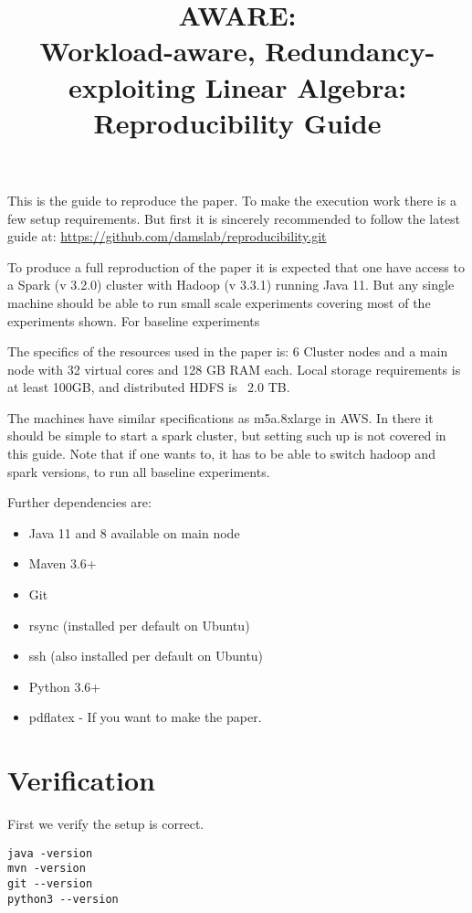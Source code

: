 \documentclass{readme}
\title{AWARE: \\ Workload-aware, Redundancy-exploiting Linear Algebra: \\ Reproducibility Guide}
\begin{document}
\maketitle

This is the guide to reproduce the paper.
To make the execution work there is a few setup requirements.
But first it is sincerely recommended to follow the latest guide at:
\url{https://github.com/damslab/reproducibility.git}

To produce a full reproduction of the paper it is expected that one have access to a Spark (v 3.2.0) cluster with Hadoop (v 3.3.1) running Java 11. But any single machine should be able to run small scale experiments covering most of the experiments shown. For baseline experiments

The specifics of the resources used in the paper is: 6 Cluster nodes and a main node with 32 virtual cores and 128 GB RAM each. Local storage requirements is at least 100GB, and distributed HDFS is ~2.0 TB.

The machines have similar specifications as m5a.8xlarge in AWS. In there it should be simple to start a spark cluster, but setting such up is not covered in this guide.
Note that if one wants to, it has to be able to switch hadoop and spark versions, to run all baseline experiments.

Further dependencies are:

\begin{itemize}
    \item Java 11 and 8 available on main node
    \item Maven 3.6+
    \item Git
    \item rsync (installed per default on Ubuntu)
    \item ssh (also installed per default on Ubuntu)
    \item Python 3.6+
    \item pdflatex - If you want to make the paper.
\end{itemize}

\section{Verification}

First we verify the setup is correct.

\begin{lstlisting}
java -version
mvn -version
git --version
python3 --version
\end{lstlisting}
\end{document}
